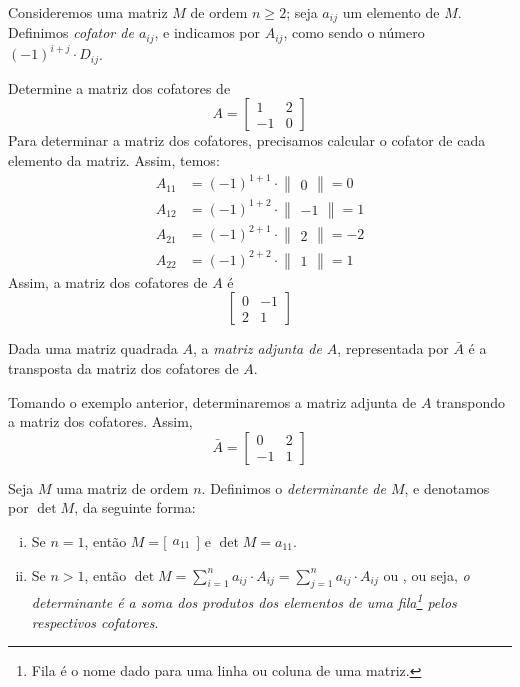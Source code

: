 \begin{df}
Consideremos uma matriz $M$ de ordem $n \ge 2$; seja $a_{ij}$ um elemento de $M$. Definimos \emph{cofator de $a_{ij}$}, e indicamos por $A_{ij}$, como sendo o número $(-1)^{i+j}\cdot D_{ij}$.
\end{df}
\begin{exemplo}
Determine a matriz dos cofatores de \[A=\begin{bmatrix}
1 & 2 \\
-1 & 0
\end{bmatrix}\]
Para determinar a matriz dos cofatores, precisamos calcular o cofator de cada elemento da matriz. Assim, temos:
\begin{align*}
A_{11}&=(-1)^{1+1}\cdot \begin{Vmatrix}
0
\end{Vmatrix}=0 \\
A_{12}&=(-1)^{1+2}\cdot \begin{Vmatrix}
-1
\end{Vmatrix}=1 \\
A_{21}&=(-1)^{2+1}\cdot \begin{Vmatrix}
2
\end{Vmatrix}=-2 \\
A_{22}&=(-1)^{2+2}\cdot \begin{Vmatrix}
1
\end{Vmatrix}=1
\end{align*}
Assim, a matriz dos cofatores de $A$ é
\[\begin{bmatrix}
0 & -1 \\
2 & 1
\end{bmatrix}\]
\end{exemplo}
\begin{df}
Dada uma matriz quadrada $A$, a \emph{matriz adjunta de $A$}, representada por $\bar{A}$ é a transposta da matriz dos cofatores de $A$.
\end{df}
\begin{exemplo}
Tomando o exemplo anterior, determinaremos a matriz adjunta de $A$ transpondo a matriz dos cofatores. Assim, 
\[\bar{A}=\begin{bmatrix}
0 & 2 \\
-1 & 1
\end{bmatrix} \]
\end{exemplo}
\begin{df}
Seja $M$ uma matriz de ordem $n$. Definimos o \emph{determinante de $M$}, e denotamos por $\det M$, da seguinte forma:
\begin{enumerate}[i)]
\item Se $n=1$, então $M=\bigl[\begin{smallmatrix}a_{11} \end{smallmatrix}\bigr]$ e $\det M = a_{11}$.
\item Se $n>1$, então $\det M = \displaystyle\sum_{i=1}^{n}a_{ij}\cdot A_{ij}=\displaystyle\sum_{j=1}^{n}a_{ij}\cdot A_{ij}$ ou , ou seja, \emph{o determinante é a soma dos produtos dos elementos de uma fila\footnote{Fila é o nome dado para uma linha ou coluna de uma matriz.} pelos respectivos cofatores}.
\end{enumerate}
\end{df}
